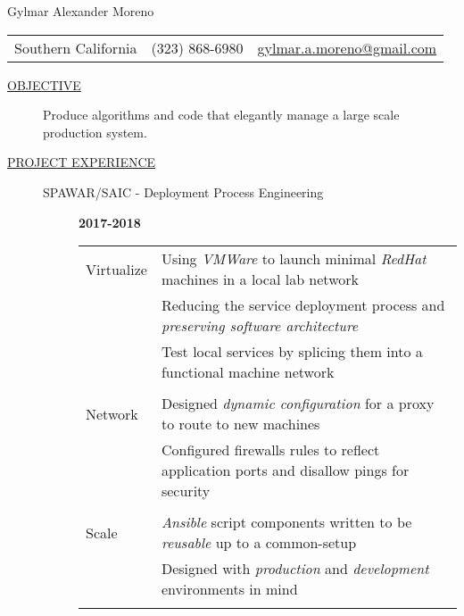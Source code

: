 \documentclass[12pt]{article}
\begin{document}
    \begin{center}
        {\LARGE Gylmar Alexander Moreno}
	\\
        \begin{tabular}{l|l|l}
            Southern California & (323) 868-6980 &
            \href{mailto:gylmar.a.moreno@gmail.com}{gylmar.a.moreno@gmail.com}
        \end{tabular}
    \end{center}

    \begin{description}
        \item[\underline{OBJECTIVE}] Produce algorithms and code that elegantly manage a large scale production system.
            \iffalse Produce algorithms and code that elegantly manage a large scale production system that\fi
        \item[\underline{PROJECT EXPERIENCE}] \hfill
            \begin{description}
                \item[SPAWAR/SAIC - Deployment Process Engineering] \hfill \textbf{2017-2018}\\
                    \begin{tabular}{l|l}
				    \\[-1.0mm]
			Virtualize & Using \textit{VMWare} to launch minimal \textit{RedHat} machines in a local lab network\\
				   & Reducing the service deployment process and \textit{preserving software architecture}\\
				   & Test local services by splicing them into a functional machine network\\
				    \\[-1.7mm]
			Network	   & Designed \textit{dynamic configuration} for a proxy to route to new machines\\
				   & Configured firewalls rules to reflect application ports and disallow pings for security\\
				    \\[-1.7mm]
			Scale	   & \textit{Ansible} script components written to be \textit{reusable} up to a common-setup\\
				   & Designed with \textit{production} and \textit{development} environments in mind\\
				    \\[-1.0mm]
                    \end{tabular}


\end{description}
\end{description}
\end{document}
